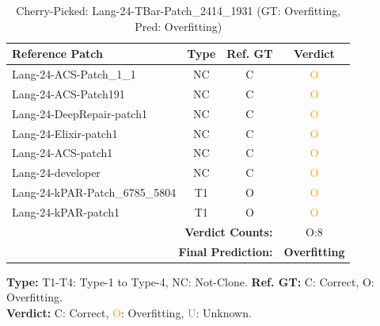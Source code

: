\begin{table}[t]
\centering
\caption{Cherry-Picked: Lang-24-TBar-Patch\_2414\_1931 (GT: Overfitting, Pred: Overfitting)}
\label{tab:cherry-Lang24TBarPatch24141931}
\footnotesize
\renewcommand{\arraystretch}{1.1}
\setlength{\tabcolsep}{4pt}
\begin{tabular}{l|c|c|c}
\hline
\textbf{Reference Patch} & \textbf{Type} & \textbf{Ref. GT} & \textbf{Verdict} \\
\hline
Lang-24-ACS-Patch\_1\_1 & NC & C & \textcolor{orange}{O} \\
Lang-24-ACS-Patch191 & NC & C & \textcolor{orange}{O} \\
Lang-24-DeepRepair-patch1 & NC & C & \textcolor{orange}{O} \\
Lang-24-Elixir-patch1 & NC & C & \textcolor{orange}{O} \\
Lang-24-ACS-patch1 & NC & C & \textcolor{orange}{O} \\
Lang-24-developer & NC & C & \textcolor{orange}{O} \\
Lang-24-kPAR-Patch\_6785\_5804 & T1 & O & \textcolor{orange}{O} \\
Lang-24-kPAR-patch1 & T1 & O & \textcolor{orange}{O} \\
\hline
\multicolumn{3}{r|}{\textbf{Verdict Counts:}} & O:8 \\
\multicolumn{3}{r|}{\textbf{Final Prediction:}} & \textbf{Overfitting} \\
\hline
\end{tabular}
\vspace{1mm}
\parbox{\linewidth}{\centering\footnotesize 
\vspace{1mm}
\textbf{Type:} T1-T4: Type-1 to Type-4, NC: Not-Clone. \;
\textbf{Ref. GT:} C: Correct, O: Overfitting. \\
\textbf{Verdict:} \textcolor{green!60!black}{C}: Correct, \textcolor{orange}{O}: Overfitting, \textcolor{gray}{U}: Unknown.}
\end{table}


